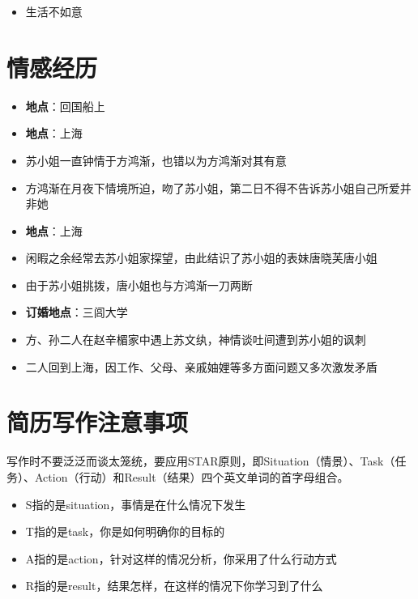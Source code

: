 \documentclass{resume}
\begin{document}
\begin{itemize}[parsep=0.5ex]
  \item 生活不如意
\end{itemize}

\section{情感经历}
\begin{itemize}[parsep=0.5ex]
  \item \textbf{地点}：回国船上
\end{itemize}

\begin{itemize}[parsep=0.5ex]
  \item \textbf{地点}：上海
  \item 苏小姐一直钟情于方鸿渐，也错以为方鸿渐对其有意
  \item 方鸿渐在月夜下情境所迫，吻了苏小姐，第二日不得不告诉苏小姐自己所爱并非她
\end{itemize}

\begin{itemize}[parsep=0.5ex]
  \item \textbf{地点}：上海
  \item 闲暇之余经常去苏小姐家探望，由此结识了苏小姐的表妹唐晓芙唐小姐
  \item 由于苏小姐挑拨，唐小姐也与方鸿渐一刀两断
\end{itemize}

\begin{itemize}[parsep=0.5ex]
  \item \textbf{订婚地点}：三闾大学
  \item 方、孙二人在赵辛楣家中遇上苏文纨，神情谈吐间遭到苏小姐的讽刺
  \item 二人回到上海，因工作、父母、亲戚妯娌等多方面问题又多次激发矛盾
\end{itemize}
\section{简历写作注意事项}
写作时不要泛泛而谈太笼统，要应用STAR原则，即Situation（情景）、Task（任务）、Action（行动）和Result（结果）四个英文单词的首字母组合。
\begin{itemize}[parsep=0.5ex]
  \item S指的是situation，事情是在什么情况下发生
  \item T指的是task，你是如何明确你的目标的
  \item A指的是action，针对这样的情况分析，你采用了什么行动方式
  \item R指的是result，结果怎样，在这样的情况下你学习到了什么
\end{itemize}
\end{document}

